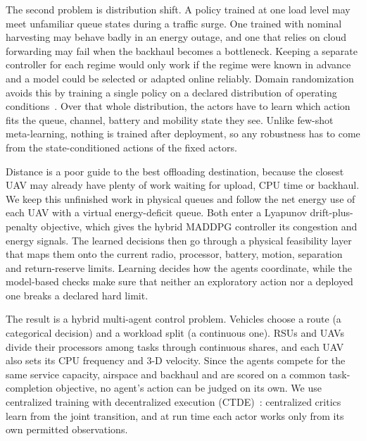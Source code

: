 \documentclass[journal]{IEEEtran}
\begin{document}
The second problem is distribution shift. A policy trained at one load level
may meet unfamiliar queue states during a traffic surge. One trained with
nominal harvesting may behave badly in an energy outage, and one that relies
on cloud forwarding may fail when the backhaul becomes a bottleneck. Keeping
a separate controller for each regime would only work if the regime were
known in advance and a model could be selected or adapted online reliably.
Domain randomization avoids this by training a single policy on a declared
distribution of operating conditions~\cite{tobin2017domain,peng2018sim}. Over
that whole distribution, the actors have to learn which action fits the
queue, channel, battery and mobility state they see. Unlike few-shot
meta-learning, nothing is trained after deployment, so any robustness has to
come from the state-conditioned actions of the fixed actors.

Distance is a poor guide to the best offloading destination, because the
closest UAV may already have plenty of work waiting for upload, CPU time or
backhaul. We keep this unfinished work in physical queues and follow the net
energy use of each UAV with a virtual energy-deficit queue. Both enter a
Lyapunov drift-plus-penalty objective, which gives the hybrid MADDPG
controller its congestion and energy signals. The learned decisions then go
through a physical feasibility layer that maps them onto the current radio,
processor, battery, motion, separation and return-reserve limits. Learning
decides how the agents coordinate, while the model-based checks make sure
that neither an exploratory action nor a deployed one breaks a declared hard
limit.

The result is a hybrid multi-agent control problem. Vehicles choose a route
(a categorical decision) and a workload split (a continuous one). RSUs and
UAVs divide their processors among tasks through continuous shares, and each
UAV also sets its CPU frequency and 3-D velocity. Since the agents compete
for the same service capacity, airspace and backhaul and are scored on a
common task-completion objective, no agent's action can be judged on its own.
We use centralized training with decentralized execution
(CTDE)~\cite{lowe2017multi}: centralized critics learn from the joint
transition, and at run time each actor works only from its own permitted
observations.
\end{document}
